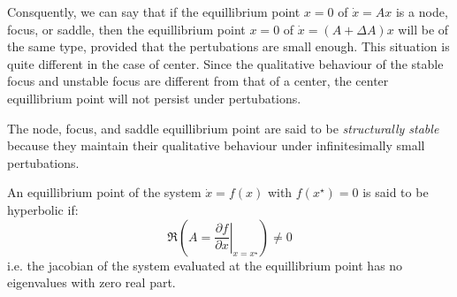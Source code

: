 Consquently, we can say that if the equillibrium point \(x=0\) of \(\dot{x} = Ax \) is a
node, focus, or saddle, then the equillibrium point \(x=0\) of \(\dot{x} = (A + \Delta A) x \)
will be of the same type, provided that the pertubations are small enough. This situation is quite different in the case of center. Since the qualitative behaviour of the
stable focus and unstable focus are different from that of a center, the center equillibrium 
point will not persist under pertubations.

The node, focus, and saddle equillibrium point are said to be \emph{structurally stable} because they
maintain their qualitative behaviour under infinitesimally small pertubations.

\begin{definition}
    An equillibrium point of the system \(\dot{x}= f(x)\) with \(f(x^{\star}) = 0\) is said to be
    hyperbolic if:
    \[
        \Re \left(
            A = \left . \frac{\partial f}{\partial x} \right |_{x=x^{\star}}
        \right) \neq 0
    \] 
    i.e. the jacobian of the system evaluated at the equillibrium point has no eigenvalues
    with zero real part.
\end{definition}

